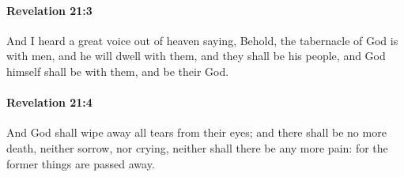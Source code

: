 		\paragraph{Revelation 21:3} %
			\label{REVELATIONNT-21-3}

			And I heard a great voice out of heaven saying, Behold, the tabernacle of God is with men, and he will dwell with them, and they shall be his people, and God himself shall be with them, and be their God.

			\begin{framed}
			\scriptsize
				\begin{compactdesc}
					\item[SBLG] 
				\end{compactdesc}
			\end{framed}

		\paragraph{Revelation 21:4} %
			\label{REVELATIONNT-21-4}

			And God shall wipe away all tears from their eyes; and there shall be no more death, neither sorrow, nor crying, neither shall there be any more pain: for the former things are passed away.

